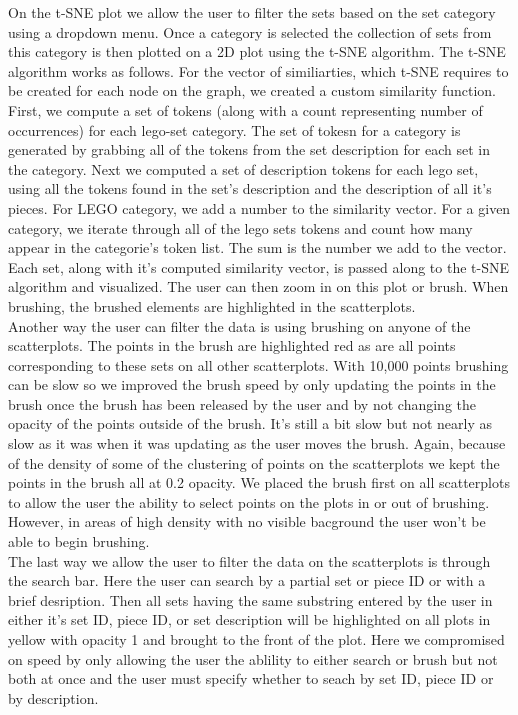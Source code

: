 \documentclass[a4paper, 12pt]{article}
\begin{document}
On the t-SNE plot we allow the user to filter the sets based on the set category using a dropdown menu. Once a category is selected the collection of sets from this category is then plotted on a 2D plot using the t-SNE algorithm. The t-SNE algorithm works as follows. 
For the vector of similiarties, which t-SNE requires to be created for each node on the graph, we created a custom similarity function. 
First, we compute a set of tokens (along with a count representing number of occurrences) for each lego-set category. The set of tokesn for a category is generated by grabbing all of the tokens from the set description for each set in the category.
Next we computed a set of description tokens for each lego set, using all the tokens found in the set's description and the description of all it's pieces. For LEGO category, we add a number to the similarity vector. For a given category, we iterate through all of the lego sets tokens and count how many appear in the categorie's token list. The sum is the number we add to the vector. Each set, along with it's computed similarity vector, is passed along to the t-SNE algorithm and visualized. The user can then zoom in on this plot or brush. When brushing, the brushed elements are highlighted in the scatterplots. \\

Another way the user can filter the data is using brushing on anyone of the scatterplots. The points in the brush are highlighted red as are all points corresponding to these sets on all other scatterplots. With 10,000 points brushing can be slow so we improved the brush speed by only updating the points in the brush once the brush has been released by the user and by not changing the opacity of the points outside of the brush. It's still a bit slow but not nearly as slow as it was when it was updating as the user moves the brush. Again, because of the density of some of the clustering of points on the scatterplots we kept the points in the brush all at 0.2 opacity. We placed the brush first on all scatterplots to allow the user the ability to select points on the plots in or out of brushing. However, in areas of high density with no visible bacground the user won't be able to begin brushing.\\

The last way we allow the user to filter the data on the scatterplots is through the search bar. Here the user can search by a partial set or piece ID or with a brief desription. Then all sets having the same substring entered by the user in either it's set ID, piece ID, or set description will be highlighted on all plots in yellow with opacity 1 and brought to the front of the plot. Here we compromised on speed by only allowing the user the ablility to either search or brush but not both at once and the user must specify whether to seach by set ID, piece ID or by description.
\end{document}
